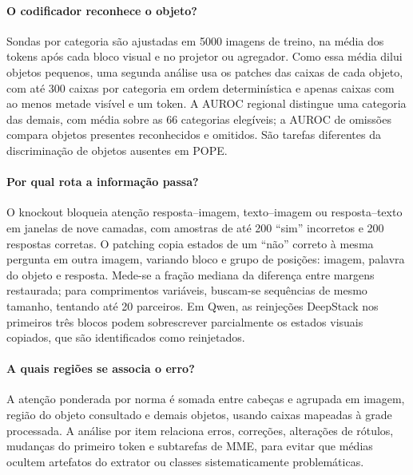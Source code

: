 \paragraph{O codificador reconhece o objeto?} Sondas por categoria são ajustadas em 5000 imagens de treino, na média dos tokens após cada bloco visual e no projetor ou agregador. Como essa média dilui objetos pequenos, uma segunda análise usa os patches das caixas de cada objeto, com até 300 caixas por categoria em ordem determinística e apenas caixas com ao menos metade visível e um token. A AUROC regional distingue uma categoria das demais, com média sobre as 66 categorias elegíveis; a AUROC de omissões compara objetos presentes reconhecidos e omitidos. São tarefas diferentes da discriminação de objetos ausentes em POPE.

\paragraph{Por qual rota a informação passa?} O knockout bloqueia atenção resposta--imagem, texto--imagem ou resposta--texto em janelas de nove camadas, com amostras de até 200 ``sim'' incorretos e 200 respostas corretas. O patching copia estados de um ``não'' correto à mesma pergunta em outra imagem, variando bloco e grupo de posições: imagem, palavra do objeto e resposta. Mede-se a fração mediana da diferença entre margens restaurada; para comprimentos variáveis, buscam-se sequências de mesmo tamanho, tentando até 20 parceiros. Em Qwen, as reinjeções DeepStack nos primeiros três blocos podem sobrescrever parcialmente os estados visuais copiados, que são identificados como reinjetados.

\paragraph{A quais regiões se associa o erro?} A atenção ponderada por norma é somada entre cabeças e agrupada em imagem, região do objeto consultado e demais objetos, usando caixas mapeadas à grade processada. A análise por item relaciona erros, correções, alterações de rótulos, mudanças do primeiro token e subtarefas de MME, para evitar que médias ocultem artefatos do extrator ou classes sistematicamente problemáticas.
